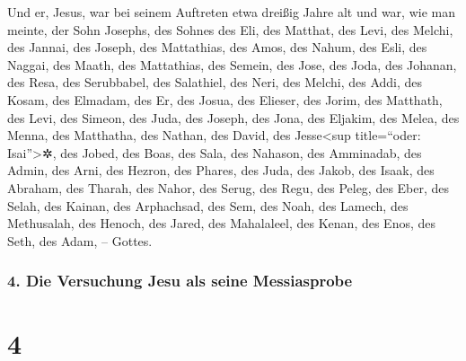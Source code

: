  Und er, Jesus, war bei seinem Auftreten etwa dreißig
Jahre alt und war, wie man meinte, der Sohn Josephs,  des
Sohnes des Eli, des Matthat, des Levi, des Melchi, des Jannai, des
Joseph,  des Mattathias, des Amos, des Nahum,
 des Esli, des Naggai, des Maath, des Mattathias, des
Semein, des Jose, des Joda,  des Johanan, des Resa, des
Serubbabel, des Salathiel, des Neri,  des Melchi, des
Addi, des Kosam, des Elmadam, des Er,  des Josua, des
Elieser, des Jorim, des Matthath, des Levi,  des Simeon,
des Juda, des Joseph, des Jona, des Eljakim,  des Melea,
des Menna, des Matthatha, des Nathan, des David,  des
Jesse\textless sup title=``oder: Isai''\textgreater✲, des Jobed, des
Boas, des Sala, des Nahason,  des Amminadab, des Admin,
des Arni, des Hezron, des Phares, des Juda,  des Jakob,
des Isaak, des Abraham, des Tharah, des Nahor,  des
Serug, des Regu, des Peleg, des Eber, des Selah,  des
Kainan, des Arphachsad, des Sem, des Noah, des Lamech, 
des Methusalah, des Henoch, des Jared, des Mahalaleel, des Kenan,
 des Enos, des Seth, des Adam, -- Gottes.

\hypertarget{die-versuchung-jesu-als-seine-messiasprobe}{%
\subsubsection{4. Die Versuchung Jesu als seine
Messiasprobe}\label{die-versuchung-jesu-als-seine-messiasprobe}}

\hypertarget{section-3}{%
\section{4}\label{section-3}}

